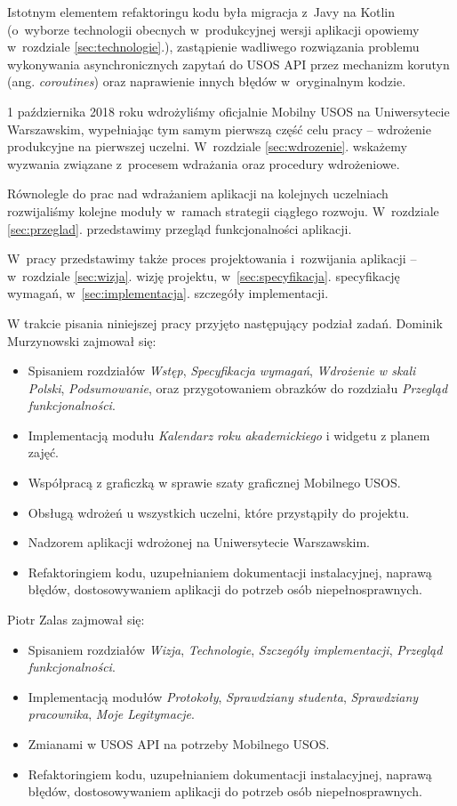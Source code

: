 \documentclass{pracamgr}
\begin{document}
Istotnym elementem refaktoringu kodu była migracja z~Javy na Kotlin (o~wyborze technologii obecnych w~produkcyjnej wersji
aplikacji opowiemy w~rozdziale \ref{sec:technologie}.), zastąpienie wadliwego rozwiązania problemu
wykonywania asynchronicznych zapytań do USOS API przez mechanizm korutyn 
(ang. \textit{coroutines}) oraz naprawienie innych błędów w~oryginalnym kodzie.

1 października 2018 roku wdrożyliśmy oficjalnie Mobilny USOS na Uniwersytecie Warszawskim,
wypełniając tym samym pierwszą część celu pracy -- wdrożenie produkcyjne na pierwszej uczelni.
W~rozdziale \ref{sec:wdrozenie}. wskażemy wyzwania związane z~procesem wdrażania oraz procedury wdrożeniowe.

Równolegle do prac nad wdrażaniem aplikacji na kolejnych uczelniach rozwijaliśmy kolejne
moduły w~ramach strategii ciągłego rozwoju. W~rozdziale \ref{sec:przeglad}. przedstawimy przegląd
funkcjonalności aplikacji.

W~pracy przedstawimy także proces projektowania i~rozwijania aplikacji -- w~rozdziale \ref{sec:wizja}.
wizję projektu, w~\ref{sec:specyfikacja}. specyfikację wymagań, w~\ref{sec:implementacja}. szczegóły implementacji.

W trakcie pisania niniejszej pracy przyjęto następujący podział zadań. Dominik Murzynowski
zajmował się:
\begin{itemize}
	\item Spisaniem rozdziałów \textit{Wstęp}, \textit{Specyfikacja wymagań},
	\textit{Wdrożenie w skali Polski}, \textit{Podsumowanie}, oraz przygotowaniem
	obrazków do rozdziału \textit{Przegląd funkcjonalności}.
	\item Implementacją modułu \textit{Kalendarz roku akademickiego} i widgetu
	z planem zajęć.
	\item Współpracą z graficzką w sprawie szaty graficznej Mobilnego USOS.
	\item Obsługą wdrożeń u wszystkich uczelni, które przystąpiły do projektu.
	\item Nadzorem aplikacji wdrożonej na Uniwersytecie Warszawskim.
	\item Refaktoringiem kodu, uzupełnianiem dokumentacji instalacyjnej, naprawą
	błędów, dostosowywaniem aplikacji do potrzeb osób niepełnosprawnych.
\end{itemize}
Piotr Zalas zajmował się:
\begin{itemize}
	\item Spisaniem rozdziałów \textit{Wizja}, \textit{Technologie},
	\textit{Szczegóły implementacji}, \textit{Przegląd funkcjonalności}.
	\item Implementacją modułów \textit{Protokoły}, \textit{Sprawdziany studenta},
	\textit{Sprawdziany pracownika}, \textit{Moje Legitymacje}.
	\item Zmianami w USOS API na potrzeby Mobilnego USOS.
	\item Refaktoringiem kodu, uzupełnianiem dokumentacji instalacyjnej, naprawą
	błędów, dostosowywaniem aplikacji do potrzeb osób niepełnosprawnych.
\end{itemize}
\end{document}
